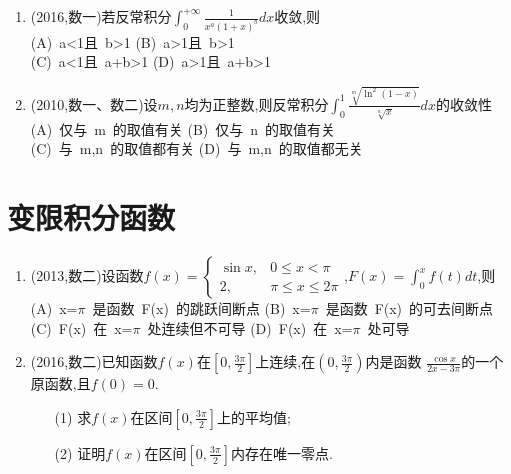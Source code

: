 \documentclass[12pt, a4paper, oneside, UTF8]{ctexbook}
\begin{document}
\begin{enumerate}[label=\arabic*.,start=11]
    \item (2016,数一)若反常积分$\int_0^{+\infty}\frac{1}{x^a(1+x)^b} dx$收敛,则 \\
        (A)\ a<1且\ b>1 \qquad
        (B)\ a>1且\ b>1 \\
        (C)\ a<1且\ a+b>1 \qquad
        (D)\ a>1且\ a+b>1
    
    \begin{solution}
    \newpage
    \end{solution}
    
    \item (2010,数一、数二)设$m,n$均为正整数,则反常积分$\int_0^1\frac{\sqrt[m]{\ln^2(1-x)}}{\sqrt[n]{x}} dx$的收敛性 \\
        (A)\ 仅与\ m\ 的取值有关 \qquad
        (B)\ 仅与\ n\ 的取值有关 \\
        (C)\ 与\ m,n\ 的取值都有关 \qquad
        (D)\ 与\ m,n\ 的取值都无关
    
    \begin{solution}
    \newpage
    \end{solution}
\end{enumerate}

\section{ 变限积分函数}

\begin{enumerate}[label=\arabic*.,start=13]
    \item (2013,数二)设函数$f(x)=\begin{cases}
        \sin x, & 0\leq x<\pi \\
        2, & \pi\leq x\leq 2\pi
    \end{cases}$,$F(x)=\int_0^x f(t) dt$,则 \\
    (A)\ x=$\pi$\ 是函数\ F(x)\ 的跳跃间断点 \qquad
    (B)\ x=$\pi$\ 是函数\ F(x)\ 的可去间断点 \\
    (C)\ F(x)\ 在\ x=$\pi$\ 处连续但不可导 \qquad
    (D)\ F(x)\ 在\ x=$\pi$\ 处可导
    
    \begin{solution}
    \newpage
    \end{solution}
    
    \item (2016,数二)已知函数$f(x)$在$[0,\frac{3\pi}{2}]$上连续,在$(0,\frac{3\pi}{2})$内是函数
    $\frac{\cos{x}}{2x-3\pi}$的一个原函数,且$f(0)=0$.
    \begin{enumerate}[label=(\roman*)]
        \item[(1)] 求$f(x)$在区间$[0,\frac{3\pi}{2}]$上的平均值;
        \item[(2)] 证明$f(x)$在区间$[0,\frac{3\pi}{2}]$内存在唯一零点.
    \end{enumerate}
    
    \begin{solution}
    \newpage
    \end{solution}
\end{enumerate}
\end{document}
